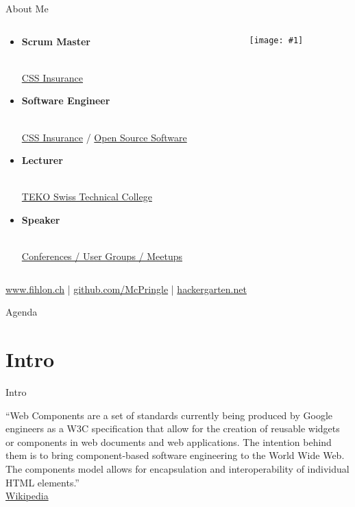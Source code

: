 \documentclass{beamer}
\newcommand{\myfig}[2]{
	\begin{minipage}[c]{\textwidth}
		\begin{center}
			\texttt{[image: \#1]}
		\end{center}
		\vspace{3mm}
	\end{minipage}
}
\newcommand{\bb}[1]{\textbf{#1}}
\newcommand{\slideItems}[1]{
	\begin{itemize}
		#1
	\end{itemize}
}
\newcommand{\slide}[2]{
	\begin{frame}{#1}
		#2
	\end{frame}
}
\begin{document}
\slide{About Me}{
	\begin{columns}
    	\begin{column}{5cm}
			\begin{tiny}
				\slideItems{
					\setlength{\itemsep}{12pt}
					\item
						\begin{normalsize}\bb{Scrum Master}\end{normalsize} \\
						\href{https://www.css.ch/}{CSS Insurance}
					\item
						\begin{normalsize}\bb{Software Engineer}\end{normalsize} \\
						\href{https://www.css.ch/}{CSS Insurance} /
						\href{https://github.com/McPringle}{Open Source Software}
					\item
						\begin{normalsize}\bb{Lecturer}\end{normalsize} \\
						\href{http://www.teko.ch/}{TEKO Swiss Technical College}
					\item
						\begin{normalsize}\bb{Speaker}\end{normalsize} \\
						\href{https://www.fihlon.ch/}{Conferences / User Groups / Meetups}
				}
			\end{tiny}
    	\end{column}
	    \begin{column}{5cm}
        	\myfig{McPringle}{0.8}
    	\end{column}
	\end{columns}
	\href{https://www.fihlon.ch}{www.fihlon.ch} |
	\href{https://github.com/McPringle}{github.com/McPringle} |
	\href{http://hackergarten.net}{hackergarten.net}
}

\slide{Agenda}{
	\setcounter{tocdepth}{1}
	\tableofcontents
}

\section{Intro}

\slide{Intro}{
	``Web Components are a set of standards currently being produced by Google engineers as a W3C specification that allow for the creation of reusable widgets or components in web documents and web applications. The intention behind them is to bring component-based software engineering to the World Wide Web. The components model allows for encapsulation and interoperability of individual HTML elements.'' \\
	\hfill\tiny{\href{https://en.wikipedia.org/wiki/Web_Components}{Wikipedia}}
}
\end{document}
